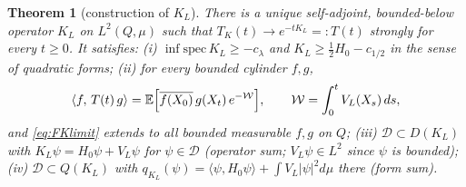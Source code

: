\documentclass[11pt,a4paper]{article}
\theoremstyle{plain}
\newtheorem{theorem}{Theorem}[section]
\theoremstyle{definition}
\newcommand{\E}{\mathbb{E}}
\newcommand{\D}{\mathcal D}
\newcommand{\ip}[2]{\langle #1,#2\rangle}
\newcommand{\muv}{\mu}
\begin{document}
\begin{theorem}[construction of $K_L$]\label{thm:A1i}
There is a unique self-adjoint, bounded-below operator $K_L$ on
$L^2(Q,\muv)$ such that $T_K(t)\to e^{-tK_L}=:T(t)$ strongly for every
$t\ge0$. It satisfies:
\emph{(i)} $\inf\mathrm{spec}\,K_L\ge-c_\lambda$ and $K_L\ge\tfrac12H_0
-c_{1/2}$ in the sense of quadratic forms;
\emph{(ii)} for every bounded cylinder $f,g$,
\begin{equation}
 \ip{f}{\,T(t)\,g}
 =\E\Bigl[\overline{f(X_0)}\,g(X_t)\,e^{-\mathcal W}\Bigr],
 \qquad \mathcal W=\int_0^tV_L(X_s)\,ds ,
 \label{eq:FKlimit}
\end{equation}
and \eqref{eq:FKlimit} extends to all bounded measurable $f,g$ on $Q$;
\emph{(iii)} $\D\subset D(K_L)$ with $K_L\psi=H_0\psi+V_L\psi$ for
$\psi\in\D$ (operator sum; $V_L\psi\in L^2$ since $\psi$ is bounded);
\emph{(iv)} $\D\subset Q(K_L)$ with
$q_{K_L}(\psi)=\ip{\psi}{H_0\psi}+\int V_L|\psi|^2d\muv$ there (form
sum).
\end{theorem}
\end{document}
